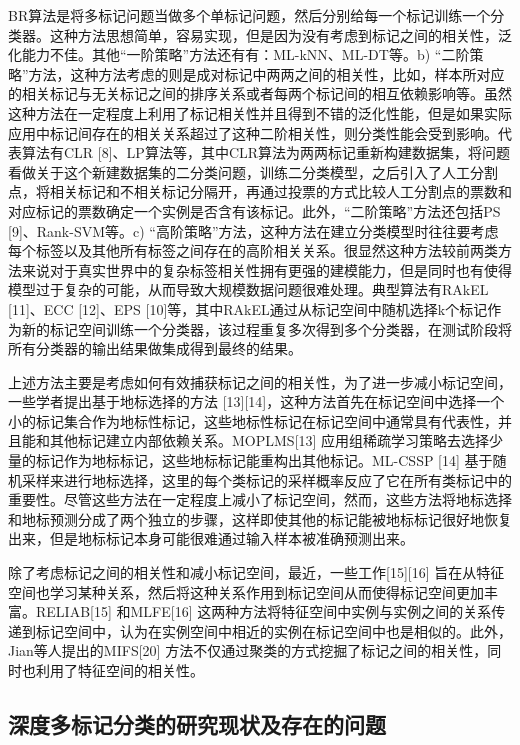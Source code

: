 BR算法是将多标记问题当做多个单标记问题，然后分别给每一个标记训练一个分类器。这种方法思想简单，容易实现，但是因为没有考虑到标记之间的相关性，泛化能力不佳。其他“一阶策略”方法还有有：ML-kNN、ML-DT等。b) “二阶策略”方法，这种方法考虑的则是成对标记中两两之间的相关性，比如，样本所对应的相关标记与无关标记之间的排序关系或者每两个标记间的相互依赖影响等。虽然这种方法在一定程度上利用了标记相关性并且得到不错的泛化性能，但是如果实际应用中标记间存在的相关关系超过了这种二阶相关性，则分类性能会受到影响。代表算法有CLR [8]、LP算法等，其中CLR算法为两两标记重新构建数据集，将问题看做关于这个新建数据集的二分类问题，训练二分类模型，之后引入了人工分割点，将相关标记和不相关标记分隔开，再通过投票的方式比较人工分割点的票数和对应标记的票数确定一个实例是否含有该标记。此外，“二阶策略”方法还包括PS [9]、Rank-SVM等。c) “高阶策略”方法，这种方法在建立分类模型时往往要考虑每个标签以及其他所有标签之间存在的高阶相关关系。很显然这种方法较前两类方法来说对于真实世界中的复杂标签相关性拥有更强的建模能力，但是同时也有使得模型过于复杂的可能，从而导致大规模数据问题很难处理。典型算法有RAkEL [11]、ECC [12]、EPS [10]等，其中RAkEL通过从标记空间中随机选择k个标记作为新的标记空间训练一个分类器，该过程重复多次得到多个分类器，在测试阶段将所有分类器的输出结果做集成得到最终的结果。

上述方法主要是考虑如何有效捕获标记之间的相关性，为了进一步减小标记空间，一些学者提出基于地标选择的方法 [13][14]，这种方法首先在标记空间中选择一个小的标记集合作为地标性标记，这些地标性标记在标记空间中通常具有代表性，并且能和其他标记建立内部依赖关系。MOPLMS[13] 应用组稀疏学习策略去选择少量的标记作为地标标记，这些地标标记能重构出其他标记。ML-CSSP [14] 基于随机采样来进行地标选择，这里的每个类标记的采样概率反应了它在所有类标记中的重要性。尽管这些方法在一定程度上减小了标记空间，然而，这些方法将地标选择和地标预测分成了两个独立的步骤，这样即使其他的标记能被地标标记很好地恢复出来，但是地标标记本身可能很难通过输入样本被准确预测出来。

除了考虑标记之间的相关性和减小标记空间，最近，一些工作[15][16] 旨在从特征空间也学习某种关系，然后将这种关系作用到标记空间从而使得标记空间更加丰富。RELIAB[15] 和MLFE[16] 这两种方法将特征空间中实例与实例之间的关系传递到标记空间中，认为在实例空间中相近的实例在标记空间中也是相似的。此外，Jian等人提出的MIFS[20] 方法不仅通过聚类的方式挖掘了标记之间的相关性，同时也利用了特征空间的相关性。


\subsection{深度多标记分类的研究现状及存在的问题}

